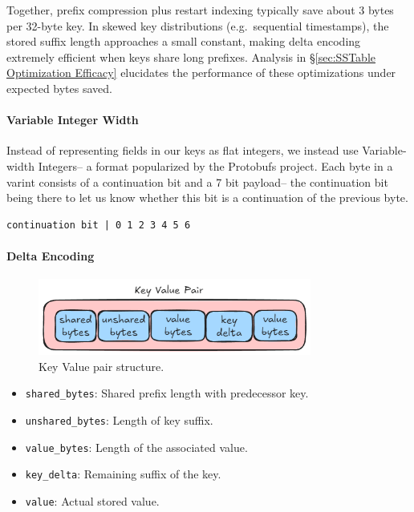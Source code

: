 \documentclass[10pt]{article}
\begin{document}
Together, prefix compression plus restart indexing typically save about 3 bytes per 32-byte key.
In skewed key distributions (e.g.\ sequential timestamps), the stored suffix length approaches a small constant, making delta encoding extremely efficient when keys share long prefixes.
Analysis in \S\ref{sec:SSTable Optimization Efficacy} elucidates the performance of these optimizations under expected bytes saved.

\paragraph{Variable Integer Width}
Instead of representing fields in our keys as flat integers, we instead use Variable-width Integers– a format popularized by the Protobufs project. Each byte in a varint consists of a continuation bit and a 7 bit payload– the continuation bit being there to let us know whether this bit is a continuation of the previous byte.
\begin{verbatim}
continuation bit | 0 1 2 3 4 5 6
\end{verbatim}

\paragraph{Delta Encoding}

\begin{figure}[htbp]
  \centering
  \includegraphics[width=0.8\textwidth]{key_value_pair.png}
  \caption{Key Value pair structure.}\label{fig:Key Value Pair}
\end{figure}

\begin{itemize}[itemsep=0pt, parsep=0pt]
  \item \texttt{shared\_bytes}: Shared prefix length with predecessor key.
  \item \texttt{unshared\_bytes}: Length of key suffix.
  \item \texttt{value\_bytes}: Length of the associated value.
  \item \texttt{key\_delta}: Remaining suffix of the key.
  \item \texttt{value}: Actual stored value.
\end{itemize}
\end{document}
